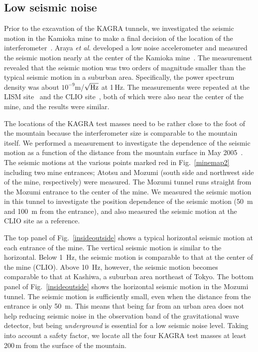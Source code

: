 \documentclass[prd ,twocolumn ,secnumarabic,dvips
,amssymb, amsmath,nobibnotes, aps, prd,superscriptaddress]{revtex4-1}
\begin{document}
{\subsection{Low seismic noise}\label{sec:seismic}
%
Prior to the excavation of the KAGRA tunnels, we investigated the seismic motion in the Kamioka mine to make a final decision of the location of the interferometer~\cite{Nishitani}. Araya {\it et al.} developed a low noise accelerometer and measured the seismic motion nearly at the center of the Kamioka mine~\cite{Araya}. The measurement revealed that the seismic motion was two orders of magnitude smaller than the typical seismic motion in a suburban area. Specifically, the power spectrum density was about $10^{-9}$m/$\sqrt{\rm Hz}$ at 1\,Hz. The measurements were repeated at the LISM site~\cite{Sato} and the CLIO site~\cite{Tomaru}, both of which were also near the center of the mine, and the results were similar. 

The locations of the KAGRA test masses need to be rather close to the foot of the mountain because the interferometer size is comparable to the mountain itself. We performed a measurement to investigate the dependence of the seismic motion as a function of the distance from the mountain surface in May 2005~{\cite{Yamamoto}\cite{Nishitani}}. The seismic motions at the various points marked red in Fig.~\ref{minemap2} including two mine entrances; Atotsu and Mozumi (south side and northwest side of the mine, respectively) were measured. The Mozumi tunnel runs straight from the Mozumi entrance to the center of the mine. We measured the seismic motion in this tunnel to investigate the position dependence of the seismic motion (50~m and 100~m from the entrance), and also measured the seismic motion at the CLIO site as a reference.

The top panel of Fig.~\ref{insideoutside} shows a typical horizontal seismic motion at each entrance of the mine. The vertical seismic motion is similar to the horizontal. Below 1~Hz, the seismic motion is comparable to that at the center of the mine (CLIO). Above 10~Hz, however, the seismic motion becomes comparable to that at Kashiwa, a suburban area northeast of Tokyo. The bottom panel of Fig.~\ref{insideoutside} shows the horizontal seismic motion in the Mozumi tunnel. The seismic motion is sufficiently small, even when the distance from the entrance is only 50~m. This means that being far from an urban area does not help reducing seismic noise in the observation band of the gravitational wave detector, but being  {\it underground} is essential for a low seismic noise level. Taking into account a safety factor, we locate all the four KAGRA test masses at least 200\,m from the surface of the mountain.

}
\end{document}
